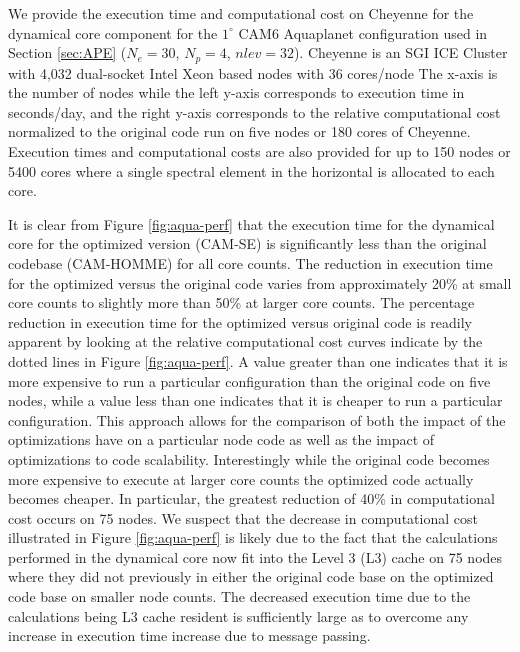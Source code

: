 \documentclass{agujournal}
\begin{document}
{We provide the execution time and computational cost on Cheyenne for the dynamical core component for the $1^\circ$ CAM6 Aquaplanet configuration used in Section \ref{sec:APE} ($N_e=30$, $N_p=4$, $nlev=32$). Cheyenne is an SGI ICE Cluster with 4,032 dual-socket Intel Xeon based nodes with 36 cores/node   The x-axis is the number of nodes while the left y-axis corresponds to execution time in seconds/day, and the right y-axis corresponds to the relative computational cost normalized to the original code run on five nodes or 180 cores of Cheyenne. Execution times and computational costs are also provided for up to 150 nodes or 5400 cores where a single spectral element in the horizontal is allocated to each core.

It is clear from Figure \ref{fig:aqua-perf} that the execution time for the dynamical core for the optimized version (CAM-SE) is significantly less than the original codebase (CAM-HOMME) for all core counts. The reduction in execution time for the optimized versus the original code varies from approximately 20\% at small core counts to slightly more than 50\% at larger core counts. The percentage reduction in execution time for the optimized versus original code is readily apparent by looking at the relative computational cost curves indicate by the dotted lines in Figure \ref{fig:aqua-perf}.  A value greater than one indicates that it is more expensive to run a particular configuration than the original code on five nodes, while a value less than one indicates that it is cheaper to run a particular configuration.  This approach allows for the comparison of both the impact of the optimizations have on a particular node code as well as the impact of optimizations to code scalability.  Interestingly while the original code becomes more expensive to execute at larger core counts the optimized code actually becomes cheaper.  In particular, the greatest reduction of 40\% in computational cost occurs on 75 nodes.  We suspect that the decrease in computational cost illustrated in Figure \ref{fig:aqua-perf} is likely due to the fact that the calculations performed in the dynamical core now fit into the Level 3 (L3) cache on 75 nodes where they did not previously in either the original code base on the optimized code base on smaller node counts.  The decreased execution time due to the calculations being L3 cache resident is sufficiently large as to overcome any increase in execution time increase due to message passing.  

}
\end{document}

